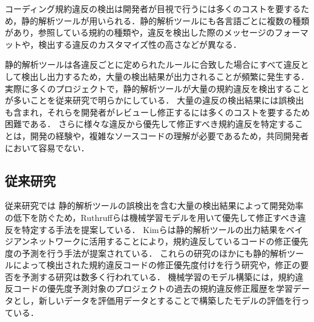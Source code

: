 \documentclass[submit,noauthor,ses,dvipdfmx]{ipsj}
\begin{document}

コーディング規約違反の検出は開発者が目視で行うには多くのコストを要するため，静的解析ツールが用いられる．静的解析ツールにも各言語ごとに複数の種類があり，参照している規約の種類や，違反を検出した際のメッセージのフォーマットや，検出する違反のカスタマイズ性の高さなどが異なる．


静的解析ツールは各違反ごとに定められたルールに合致した場合にすべて違反として検出し出力するため，大量の検出結果が出力されることが頻繁に発生する．実際に多くのプロジェクトで，静的解析ツールが大量の規約違反を検出することが多いことを従来研究で明らかにしている\cite{UsingStaticAnalysisTools2}．
大量の違反の検出結果には誤検出も含まれ，それらを開発者がレビューし修正するには多くのコストを要するため困難である．
さらに様々な違反から優先して修正すべき規約違反を特定することは，開発の経験や，複雑なソースコードの理解が必要であるため，共同開発者において容易でない\cite{shuseisarenai}．


\subsection{従来研究}

従来研究では
静的解析ツールの誤検出を含む大量の検出結果によって開発効率の低下を防ぐため，Ruthruffらは機械学習モデルを用いて優先して修正すべき違反を特定する手法を提案している\cite{JyuraiPre}．
Kimらは静的解析ツールの出力結果をベイジアンネットワークに活用することにより，規約違反しているコードの修正優先度の予測を行う手法が提案されている\cite{beizu}．
これらの研究のほかにも静的解析ツールによって検出された規約違反コードの修正優先度付けを行う研究や，修正の要否を予測する研究は数多く行われている\cite{Wang}\cite{Qing}\cite{HowFar}．
機械学習のモデル構築には，規約違反コードの優先度予測対象のプロジェクトの過去の規約違反修正履歴を学習データとし，新しいデータを評価用データとすることで構築したモデルの評価を行っている．
\end{document}
